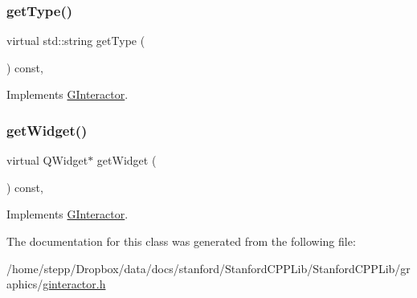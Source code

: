 \subsubsection{\texorpdfstring{get\+Type()}{getType()}}
{\footnotesize\ttfamily virtual std\+::string get\+Type (\begin{DoxyParamCaption}{ }\end{DoxyParamCaption}) const\hspace{0.3cm}{\ttfamily [inline]}, {\ttfamily [virtual]}}



Implements \mbox{\hyperlink{classGInteractor_a799e073a127b428cc841086d42ea4fed}{G\+Interactor}}.

\mbox{\label{classGGenericInteractor_aea59749a10df6f41058a9baa187d6225}} 
\subsubsection{\texorpdfstring{get\+Widget()}{getWidget()}}
{\footnotesize\ttfamily virtual Q\+Widget$\ast$ get\+Widget (\begin{DoxyParamCaption}{ }\end{DoxyParamCaption}) const\hspace{0.3cm}{\ttfamily [inline]}, {\ttfamily [virtual]}}



Implements \mbox{\hyperlink{classGInteractor_ab24f356dc18234a42825522816e1094d}{G\+Interactor}}.



The documentation for this class was generated from the following file\+:\begin{DoxyCompactItemize}
\item 
/home/stepp/\+Dropbox/data/docs/stanford/\+Stanford\+C\+P\+P\+Lib/\+Stanford\+C\+P\+P\+Lib/graphics/\mbox{\hyperlink{ginteractor_8h}{ginteractor.\+h}}\end{DoxyCompactItemize}
